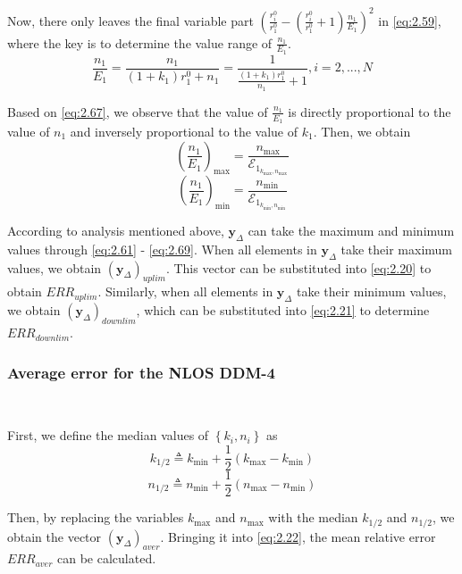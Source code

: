 \documentclass[journal]{IEEEtran}
\begin{document}
Now, there only leaves the final variable part  $\left({\frac{{r}_{i}^{0}}{{r}_{1}^{0}}}-\left({\frac{{r}_{i}^{0}}{{r}_{1}^{0}}}+1\right){\frac{n_1}{E_1}}\right)^2$ in \eqref{eq:2.59}, where the key is to determine the value range of $\frac{n_1}{E_1}$.
\begin{equation}\label{eq:2.67}
\frac{n_1}{E_1} = \frac{n_1}{(1+{k_1}){{r}_{1}^{0}}+{n_1}}
= \frac{1}{\frac{(1+{k_1}){{r}_{1}^{0}}}{n_1}+1},i=2,...,N
\end{equation}

Based on \eqref{eq:2.67}, we observe that the value of $\frac{n_1}{E_1}$ is directly proportional to the value of ${n_1}$ and inversely proportional to the value of ${k_1}$. Then, we obtain
\begin{equation}\label{eq:2.68}
   \left(\frac{n_1}{E_1}\right)_{\max}= \frac{n_{\max}}{\mathcal {E}_{1_{{k_{\max}},{n_{\max}}}}}
\end{equation}
\begin{equation}\label{eq:2.69}
   \left(\frac{n_1}{E_1}\right)_{\min}= \frac{n_{\min}}{\mathcal{E}_{1_{{k_{\min}},{n_{\min}}}}}
\end{equation}

According to analysis mentioned above,  $\mathbf{y}_{\Delta}$ can take the maximum and minimum values through \eqref{eq:2.61} - \eqref{eq:2.69}. When all elements in $\mathbf{y}_{\Delta}$ take their maximum values, we obtain $\left(\mathbf{y}_{\Delta}\right)_{uplim}$. This vector can be substituted into \eqref{eq:2.20} to obtain ${ERR}_{uplim}$. Similarly, when all elements in $\mathbf{y}_{\Delta}$ take their minimum values, we obtain $\left(\mathbf{y}_{\Delta}\right)_{downlim}$, which can be substituted into \eqref{eq:2.21} to determine  ${ERR}_{downlim}$.
\subsubsection{Average error for the NLOS DDM-4}
\

First, we define the median values of $\left\{{k_i}, {n_i}\right\}$ as 
\begin{equation}\label{eq:2.70}
      {k_{1/2}} \triangleq {k_{\min}}+ \frac{1}{2}({k_{\max}}-{k_{\min}})
\end{equation}
\begin{equation}\label{eq:2.71}
   {n_{1/2}} \triangleq {n_{\min}}+ \frac{1}{2}({n_{\max}}-{n_{\min}})
\end{equation}

Then, by replacing the variables $k_{\max}$ and $n_{\max}$ with the median ${k_{1/2}}$ and ${n_{1/2}}$, we obtain the vector $(\mathbf{y}_{\Delta})_{aver}$. Bringing it into \eqref{eq:2.22}, the mean relative error  ${ERR}_{aver}$ can be calculated.
\end{document}
